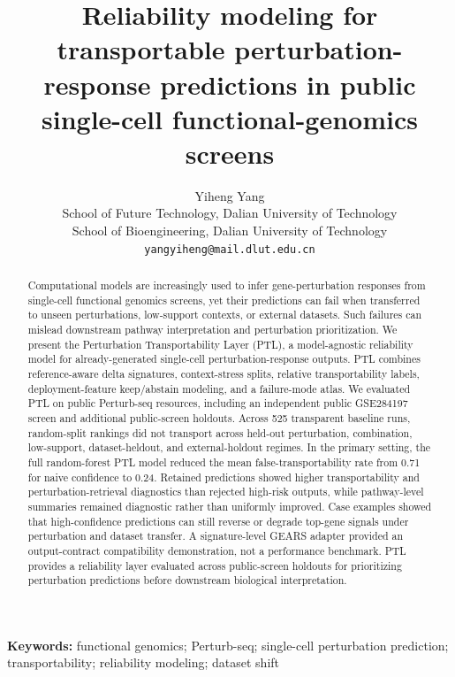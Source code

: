 \documentclass[11pt]{article}
\title{Reliability modeling for transportable perturbation-response predictions in public single-cell functional-genomics screens}
\author{Yiheng Yang\\
School of Future Technology, Dalian University of Technology\\
School of Bioengineering, Dalian University of Technology\\
\texttt{yangyiheng@mail.dlut.edu.cn}}
\date{}
\begin{document}
\maketitle

\begin{abstract}
Computational models are increasingly used to infer gene-perturbation responses from single-cell functional genomics screens, yet their predictions can fail when transferred to unseen perturbations, low-support contexts, or external datasets. Such failures can mislead downstream pathway interpretation and perturbation prioritization. We present the Perturbation Transportability Layer (PTL), a model-agnostic reliability model for already-generated single-cell perturbation-response outputs. PTL combines reference-aware delta signatures, context-stress splits, relative transportability labels, deployment-feature keep/abstain modeling, and a failure-mode atlas. We evaluated PTL on public Perturb-seq resources, including an independent public GSE284197 screen and additional public-screen holdouts. Across 525 transparent baseline runs, random-split rankings did not transport across held-out perturbation, combination, low-support, dataset-heldout, and external-holdout regimes. In the primary setting, the full random-forest PTL model reduced the mean false-transportability rate from 0.71 for naive confidence to 0.24. Retained predictions showed higher transportability and perturbation-retrieval diagnostics than rejected high-risk outputs, while pathway-level summaries remained diagnostic rather than uniformly improved. Case examples showed that high-confidence predictions can still reverse or degrade top-gene signals under perturbation and dataset transfer. A signature-level GEARS adapter provided an output-contract compatibility demonstration, not a performance benchmark. PTL provides a reliability layer evaluated across public-screen holdouts for prioritizing perturbation predictions before downstream biological interpretation.
\end{abstract}

\noindent\textbf{Keywords:} functional genomics; Perturb-seq; single-cell perturbation prediction; transportability; reliability modeling; dataset shift






\end{document}
